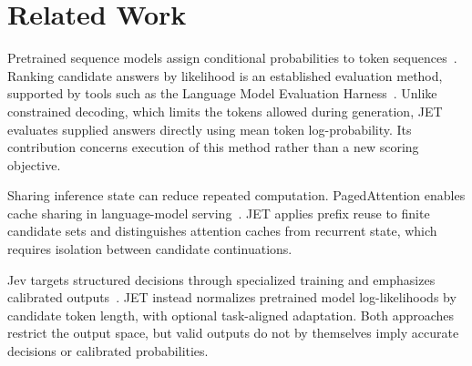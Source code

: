 \section{Related Work}
\label{sec:background}
Pretrained sequence models assign conditional probabilities to token
sequences~\cite{transformer}. Ranking candidate answers by likelihood is an
established evaluation method, supported by tools such as the Language Model
Evaluation Harness~\cite{lm-harness}. Unlike constrained decoding, which limits
the tokens allowed during generation, JET evaluates supplied answers directly
using mean token log-probability.
Its contribution concerns execution of this method rather than a new scoring
objective.

Sharing inference state can reduce repeated computation. PagedAttention enables
cache sharing in language-model serving~\cite{pagedattention}. JET applies prefix
reuse to finite candidate sets and distinguishes attention caches from recurrent
state, which requires isolation between candidate continuations.

Jev targets structured decisions through specialized training and emphasizes
calibrated outputs~\cite{jev-introduction,jev-docs}. JET instead normalizes
pretrained model log-likelihoods by candidate token length, with optional
task-aligned adaptation. Both approaches restrict the output space, but valid outputs
do not by themselves imply accurate decisions or calibrated probabilities.
